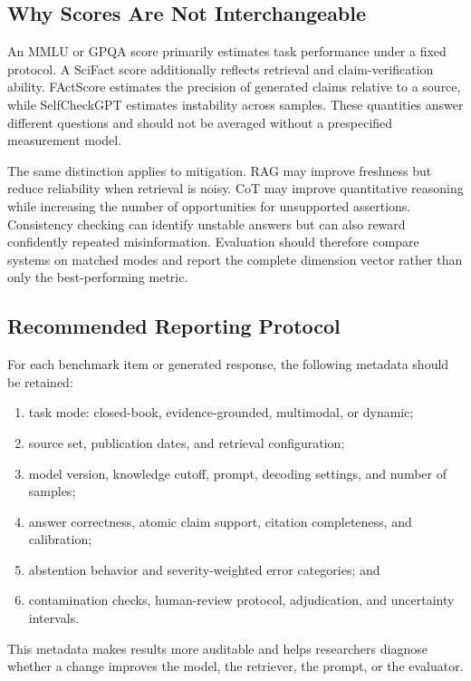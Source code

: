 \documentclass[manuscript,nonacm]{acmart}
\begin{document}
\subsection{Why Scores Are Not Interchangeable}\label{sec:scorelimits}
An MMLU or GPQA score primarily estimates task performance under a fixed protocol. A SciFact score additionally reflects retrieval and claim-verification ability. FActScore estimates the precision of generated claims relative to a source, while SelfCheckGPT estimates instability across samples. These quantities answer different questions and should not be averaged without a prespecified measurement model.

The same distinction applies to mitigation. RAG may improve freshness but reduce reliability when retrieval is noisy. CoT may improve quantitative reasoning while increasing the number of opportunities for unsupported assertions. Consistency checking can identify unstable answers but can also reward confidently repeated misinformation. Evaluation should therefore compare systems on matched modes and report the complete dimension vector rather than only the best-performing metric.

\subsection{Recommended Reporting Protocol}\label{sec:reporting}
For each benchmark item or generated response, the following metadata should be retained:
\begin{enumerate}[leftmargin=*,itemsep=1pt,topsep=2pt]
    \item task mode: closed-book, evidence-grounded, multimodal, or dynamic;
    \item source set, publication dates, and retrieval configuration;
    \item model version, knowledge cutoff, prompt, decoding settings, and number of samples;
    \item answer correctness, atomic claim support, citation completeness, and calibration;
    \item abstention behavior and severity-weighted error categories; and
    \item contamination checks, human-review protocol, adjudication, and uncertainty intervals.
\end{enumerate}

This metadata makes results more auditable and helps researchers diagnose whether a change improves the model, the retriever, the prompt, or the evaluator.
\end{document}
